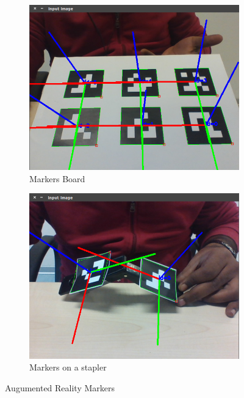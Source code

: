 \documentclass[12pt,a4paper]{report}
\begin{document}
\begin{figure}[H]
	\begin{subfigure}[b]{0.5\textwidth}
		\centering
		\includegraphics[scale=0.3]{figures/markersboard.png}
		\caption{Markers Board}
		\label{markersboard}
	\end{subfigure}
	\begin{subfigure}[b]{0.5\textwidth}
		\centering
		\includegraphics[scale=0.3]{figures/stapler.png}
		\caption{Markers on a stapler}
		\label{marker_stapler}
	\end{subfigure}
	\caption{Augumented Reality Markers}
	\label{armarkers}
\end{figure}
\end{document}
